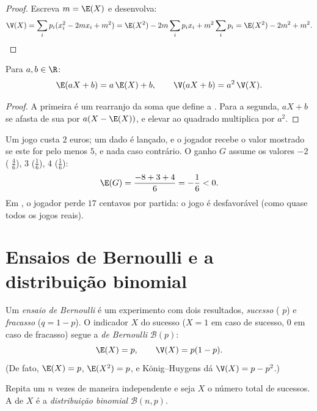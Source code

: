 \begin{proof}
Escreva $m = \E(X)$ e desenvolva:
\[
\V(X) = \sum_i p_i (x_i^2 - 2m x_i + m^2)
= \E(X^2) - 2m\sum_i p_i x_i + m^2\sum_i p_i
= \E(X^2) - 2m^2 + m^2 . \qedhere
\]
\end{proof}

\begin{proposition}\label{prop:g12:randvar:affine}
Para $a, b \in \R$:
\[
\E(aX + b) = a\,\E(X) + b, \qquad
\V(aX + b) = a^2\,\V(X) .
\]
\end{proposition}

\begin{proof}
A primeira é um rearranjo da soma que define a . Para a segunda,
$aX + b$ se afasta de sua  por $a(X - \E(X))$, e elevar ao quadrado
multiplica por $a^2$.
\end{proof}

\begin{example}\label{ex:g12:randvar:game}
Um jogo custa $2$ euros; um dado é lançado, e o jogador recebe o valor
mostrado se este for pelo menos $5$, e nada caso contrário. O ganho $G$
assume os valores $-2$ ( $\frac46$), $3$ ($\frac16$), $4$
($\frac16$):
\[
\E(G) = \frac{-8 + 3 + 4}{6} = -\frac{1}{6} < 0 .
\]
Em , o jogador perde $17$ centavos por partida: o jogo é
desfavorável (como quase todos os jogos reais).
\end{example}

\section{Ensaios de Bernoulli e a distribuição binomial}

\begin{definition}\label{def:g12:randvar:bernoulli}
Um \emph{ensaio de Bernoulli} é um experimento
com dois resultados, \emph{sucesso} ( $p$) e \emph{fracasso}
($q = 1 - p$). O indicador $X$ do sucesso ($X = 1$ em caso de sucesso, $0$
em caso de fracasso) segue a \emph{ de Bernoulli}
$\mathcal B(p)$:
\[
\E(X) = p, \qquad \V(X) = p(1-p) .
\]
(De fato, $\E(X) = p$, $\E(X^2) = p$, e König--Huygens dá
$\V(X) = p - p^2$.)
\end{definition}

\begin{definition}\label{def:g12:randvar:binomial}
Repita um  $n$ vezes de maneira independente e seja $X$
o número total de sucessos. A  de $X$ é a \emph{distribuição
binomial} $\mathcal B(n, p)$.
\end{definition}

